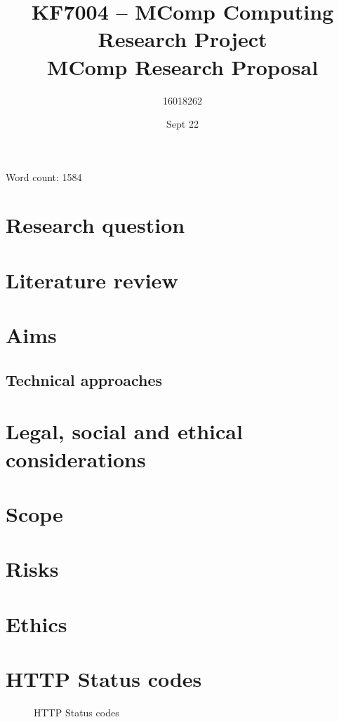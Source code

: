 \documentclass[10pt]{article}
\title{KF7004 – MComp Computing Research Project \\ MComp Research Proposal}
\author{16018262}
\date{Sept 22}
\begin{document}
\maketitle
\begin{center}
	Word count: 1584
\end{center}
\tableofcontents
\section{Research question}

\section{Literature review}

\section{Aims}

\subsection{Technical approaches}

\section{Legal, social and ethical considerations}

\section{Scope}

\section{Risks}


\printbibliography
\appendix
\section{Ethics} \label{ethics}
%
\newpage
\section{HTTP Status codes} \label{codes}
\vspace{5mm} %
\begin{figure}[] \label{HTTP Status codes}
    \centering
    \caption{HTTP Status codes}
    \label{fig:my_label}
\end{figure}
\end{document}
